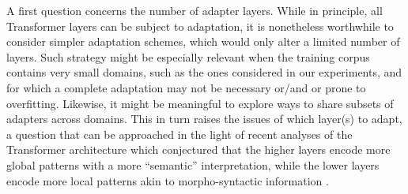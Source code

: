 \documentclass[11pt,a4paper]{article}
\newcommand{\fyTodo}[1]{\Todo[FY:]{\textcolor{orange}{#1}}}
\newcommand{\domain}[1]{\texttt{\textsc{#1}}}
\begin{document}
A first question concerns the number of adapter layers. While in principle, all Transformer layers can be subject to adaptation, it is nonetheless worthwhile to consider simpler adaptation schemes, which would only alter a limited number of layers. Such strategy might be especially relevant when the training corpus contains very small domains, such as the ones considered in our experiments, and for which a complete adaptation may not be necessary or/and or prone to overfitting. Likewise, it might be meaningful to explore ways to share subsets of adapters across domains. This in turn raises the issues of which layer(s) to adapt, a question that can be approached in the light of recent analyses of the Transformer architecture which conjectured that the higher layers encode more global patterns with a more ``semantic'' interpretation, while the lower layers encode more local patterns akin to morpho-syntactic information \cite{raganato18analysis}.

\end{document}
